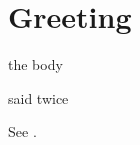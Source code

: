 \flmHeading[toc=true]
\section{Greeting }{\flmLabels{\label{ref1}}}

\begin{flmUEwrap}{}the body\end{flmUEwrap}

\begin{flmUEtwice}said twice\end{flmUEtwice}

See .
\RequirePackage{newunicodechar}
\RequirePackage{zref-clever}
%
%
